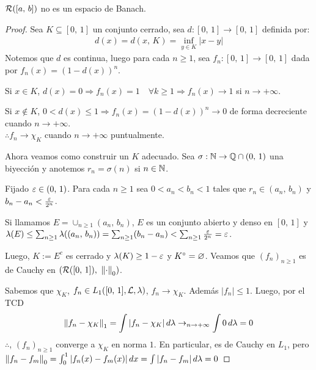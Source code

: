\newpage

\begin{prop}
    \(\mathcal{R}([a \text{, } b])\) no es un espacio de Banach.

    \begin{proof}
        Sea \(K \subseteq [0\text{, } 1]\) un conjunto cerrado, sea \(d: [0 \text{, } 1] \to [0 \text{, } 1]\) definida por: \begin{align*}
            d(x) = d(x \text{, } K) = \inf_{y \in K} |x-y|
        \end{align*}
        Notemos que \(d\) es continua, luego para cada \(n \geq 1\), sea \(f_n : [0 \text{, } 1] \to [0 \text{, } 1]\) dada por \(f_n(x) = (1 - d(x))^n\).

        Si \(x \in K\), \(d(x) = 0 \Rightarrow f_n(x) = 1 \quad \forall k \geq 1 \Rightarrow f_n(x) \to 1\) si \(n \to +\infty\).

        Si \(x \notin K\), \(0 < d(x) \leq 1 \Rightarrow f_n(x) = (1- d(x))^n \to 0\) de forma decreciente cuando \(n \to +\infty\).
        \\ \(\therefore f_n \to \chi_K\) cuando \(n \to +\infty\) puntualmente.

        Ahora veamos como construir un \(K\) adecuado. Sea \(\sigma: \mathbb{N} \to \mathbb{Q} \cap (0 \text{, } 1)\) una biyección y anotemos \(r_n = \sigma(n)\) si \(n \in \mathbb{N}\).

        Fijado \(\varepsilon \in (0\text{, }1)\). Para cada \(n \geq 1\) sea \(0 < a_n < b_n < 1\) tales que \(r_n \in (a_n \text{, } b_n)\) y \(b_n - a_n < \frac{\varepsilon}{2^n}\).

        Si llamamos \(E = \cup_{n \geq 1} (a_n \text{, } b_n)\), \(E\) es un conjunto abierto y denso en \([0 \text{, }1]\) y \(\lambda(E) \leq \sum_{n \geq 1} \lambda((a_n \text{, } b_n)) = \sum_{n \geq 1} (b_n - a_n) < \sum_{n \geq 1} \frac{\varepsilon}{2^n} = \varepsilon\).

        Luego, \(K := E^c\) es cerrado y \(\lambda(K) \geq 1 - \varepsilon\) y \(K^{\circ} = \varnothing\). Veamos que \((f_n)_{n \geq 1}\) es de Cauchy en \((\mathcal{R}([0 \text{, } 1]) \text{, } \left\lVert\cdot\right\rVert_0)\).

        Sabemos que \(\chi_K\), \(f_n \in L_1([0 \text{, } 1], \mathcal{L}, \lambda)\), \(f_n \to \chi_K\). Además \(|f_n| \leq 1\). Luego, por el TCD \begin{align*}
            \left\lVert f_n - \chi_K\right\rVert_1 = \int |f_n - \chi_K | \, d\lambda \to_{n \to +\infty} \int 0 \, d\lambda = 0
        \end{align*}
        \(\therefore\), \((f_n)_{n \geq 1}\) converge a \(\chi_K\) en norma \(1\). En particular, es de Cauchy en \(L_1\), pero \(\left\lVert f_n - f_m\right\rVert_0 = \int_{0}^{1} | f_n(x) - f_m(x) | \, dx = \int |f_n - f_m| \, d\lambda = 0\)


\end{proof}
\end{prop}

